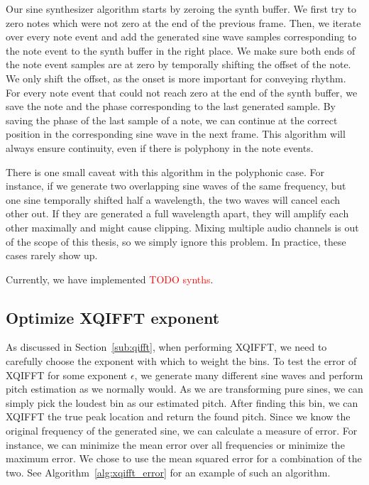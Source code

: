 \documentclass[a4paper,10pt,twocolumn]{article}
\begin{document}
Our sine synthesizer algorithm starts by zeroing the synth buffer. We first try to zero notes which were not zero at the end of the previous frame. Then, we iterate over every note event and add the generated sine wave samples corresponding to the note event to the synth buffer in the right place. We make sure both ends of the note event samples are at zero by temporally shifting the offset of the note. We only shift the offset, as the onset is more important for conveying rhythm. For every note event that could not reach zero at the end of the synth buffer, we save the note and the phase corresponding to the last generated sample. By saving the phase of the last sample of a note, we can continue at the correct position in the corresponding sine wave in the next frame. This algorithm will always ensure continuity, even if there is polyphony in the note events.

There is one small caveat with this algorithm in the polyphonic case. For instance, if we generate two overlapping sine waves of the same frequency, but one sine temporally shifted half a wavelength, the two waves will cancel each other out. If they are generated a full wavelength apart, they will amplify each other maximally and might cause clipping. Mixing multiple audio channels is out of the scope of this thesis, so we simply ignore this problem. In practice, these cases rarely show up.


Currently, we have implemented \textcolor{red}{TODO synths}. %


\subsection{Optimize XQIFFT exponent}  \label{sub:opt_xqfft}
As discussed in Section~\ref{sub:qifft}, when performing XQIFFT, we need to carefully choose the exponent with which to weight the bins. To test the error of XQIFFT for some exponent $\epsilon$, we generate many different sine waves and perform pitch estimation as we normally would. As we are transforming pure sines, we can simply pick the loudest bin as our estimated pitch. After finding this bin, we can XQIFFT the true peak location and return the found pitch. Since we know the original frequency of the generated sine, we can calculate a measure of error. For instance, we can minimize the mean error over all frequencies or minimize the maximum error. We chose to use the mean squared error for a combination of the two. See Algorithm~\ref{alg:xqifft_error} for an example of such an algorithm.

\end{document}
